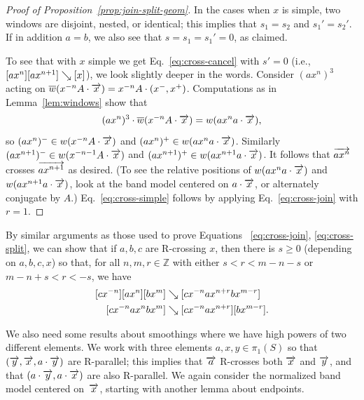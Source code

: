 \begin{proof}[Proof of Proposition~\ref{prop:join-split-geom}]
  In the cases when $x$ is simple, two windows are disjoint, nested,
  or identical; this implies that $s_1 = s_2$ and $s_1' = s_2'$.
  If in
  addition $a=b$, we also see that $s = s_1=s_1'=0$, as claimed.

  To see that with $x$ simple we get Eq.~\eqref{eq:cross-cancel} with
  $s'=0$ (i.e., $[ax^n][ax^{n+1}] \mathrel{\searrow} [x]$), we look slightly deeper
  in the words.%
  Consider $(a x^n)^3$ acting on
  $\overline{w}(x^{-n} A \cdot \overrightarrow{x}) = x^{-n} A \cdot (x^-,x^+)$.
  Computations as in Lemma~\ref{lem:windows} show that
  \[
    (a x^n)^3 \cdot \overline{w}(x^{-n} A \cdot \overrightarrow{x}) = w(a x^n a
    \cdot \overrightarrow{x}),
  \]
  so $(a x^n)^- \in w(x^{-n} A \cdot \overrightarrow{x})$ and
  $(a x^n)^+ \in w(a x^n a \cdot \overrightarrow{x})$. Similarly
  $(a x^{n+1})^- \in w(x^{-n-1} A \cdot \overrightarrow{x})$ and
  $(a x^{n+1})^+ \in w(a x^{n+1} a \cdot \overrightarrow{x})$. It follows that
  $\overrightarrow{ax^n}$ crosses $\overrightarrow{ax^{n+1}}$ as desired. (To see the
  relative positions of $w(a x^n a \cdot \overrightarrow{x})$ and
  $w(a x^{n+1} a \cdot \overrightarrow{x})$, look at the band model centered on
  $a \cdot \overrightarrow{x}$, or alternately conjugate by $A$.)
  Eq.~\eqref{eq:cross-simple} follows by applying
  Eq.~\eqref{eq:cross-join} with $r=1$.
\end{proof}

\begin{remark}
\label{rmk:triple_limits}
By similar arguments as those used to prove Equations~   \ref{eq:cross-join},   \ref{eq:cross-split}, we can show that if $a,b,c$ are R-crossing $x$, then there is $s \ge 0$ (depending on $a,b,c,x$)
  so that, for all
 $n, m, r \in \mathbb{Z}$ with either $s < r < m-n-s$ or $m-n+s < r <
 -s$, we have
  \begin{align}
    \label{eq:cross-join-triple} [cx^{-n}][a x^n] [b x^m] &\mathrel{\searrow} [cx^{-n}ax^{n+r}bx^{m-r}]\\
    \label{eq:cross-split-triple} [cx^{-n}a x^nb x^m] &\mathrel{\searrow} [cx^{-n}ax^{n+r}][bx^{m-r}].
  \end{align}
\end{remark}

We also need some results about smoothings where we have high powers of
two different elements. We work with three elements $a,x,y\in\pi_1(S)$
so that $(\overrightarrow{y},\overrightarrow{x},a\cdot\overrightarrow{y})$ are R-parallel; this
implies that $\overrightarrow{a}$ R-crosses both $\overrightarrow{x}$ and
$\overrightarrow{y}$, and that $(a\cdot\overrightarrow{y},a\cdot\overrightarrow{x})$ are also
R-parallel.
We again consider the normalized band model
centered on~$\overrightarrow{x}$, starting with another lemma about endpoints.

